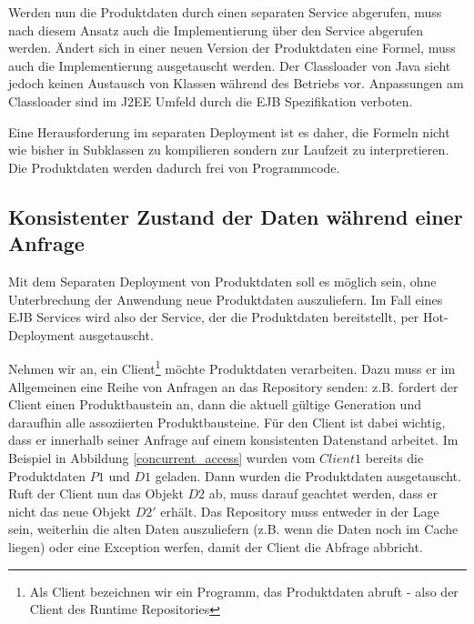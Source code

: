\documentclass[headsepline=true, footsepline=true]{scrartcl}
\begin{document}
Werden nun die Produktdaten durch einen separaten Service abgerufen, muss nach
diesem Ansatz auch die Implementierung über den Service abgerufen werden. Ändert
sich in einer neuen Version der Produktdaten eine Formel, muss auch die
Implementierung ausgetauscht werden. Der Classloader von Java sieht jedoch keinen
Austausch von Klassen während des Betriebs vor. Anpassungen am Classloader sind
im J2EE Umfeld durch die EJB Spezifikation verboten.

Eine Herausforderung im separaten Deployment ist es daher, die Formeln nicht wie
bisher in Subklassen zu kompilieren sondern zur Laufzeit zu interpretieren. Die
Produktdaten werden dadurch frei von Programmcode.

\subsection{Konsistenter Zustand der Daten während einer Anfrage}
\label{requests}

Mit dem Separaten Deployment von Produktdaten soll es möglich sein, ohne
Unterbrechung der Anwendung neue Produktdaten auszuliefern. Im Fall
eines EJB Services wird also der Service, der die Produktdaten bereitstellt, per
Hot-Deployment ausgetauscht.

Nehmen wir an, ein Client\footnote{Als Client bezeichnen wir ein Programm, das
Produktdaten abruft - also der Client des Runtime Repositories} möchte
Produktdaten verarbeiten. Dazu muss er im Allgemeinen eine Reihe von Anfragen an
das Repository senden: z.B. fordert der Client einen Produktbaustein an, dann die
aktuell gültige Generation und daraufhin alle assoziierten Produktbausteine. Für
den Client ist dabei wichtig, dass er innerhalb seiner Anfrage auf einem
konsistenten Datenstand arbeitet. Im Beispiel in Abbildung
\ref{concurrent_access} wurden vom $Client 1$ bereits die Produktdaten $P1$ und
$D1$ geladen. Dann wurden die Produktdaten ausgetauscht. Ruft der Client nun das
Objekt $D2$ ab, muss darauf geachtet werden, dass er nicht das neue
Objekt $D2'$ erhält. Das Repository muss entweder in der Lage sein, weiterhin
die alten Daten auszuliefern (z.B. wenn die Daten noch im Cache liegen) oder eine
Exception werfen, damit der Client die Abfrage abbricht.
\end{document}
